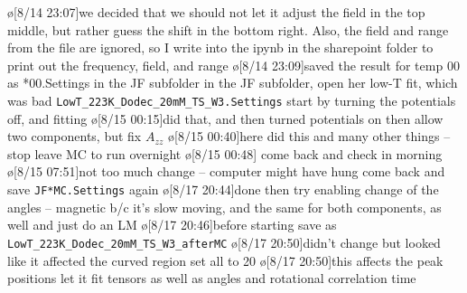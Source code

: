 \o[8/14 23:07]{we decided that we should not let it adjust the field in the top middle, but rather guess the shift in the bottom right.  Also, the field and range from the file are ignored, so I write into the ipynb in the sharepoint folder to print out the frequency, field, and range}
\o[8/14 23:09]{saved the result for temp 00 as *00.Settings in the JF subfolder}
in the JF subfolder, open her low-T fit, which was bad
\texttt{LowT_223K_Dodec_20mM_TS_W3.Settings}
start by turning the potentials off, and fitting
\o[8/15 00:15]{did that, and then turned potentials on}
then allow two components, but fix $A_{zz}$
\o[8/15 00:40]{here did this and many other things -- stop}
leave MC to run overnight
\o[8/15 00:48]{}
come back and check in morning
\o[8/15 07:51]{not too much change -- computer might have hung}
come back and save \texttt{JF*MC.Settings} again
\o[8/17 20:44]{done}
then try enabling change of the angles -- magnetic b/c it's slow moving, and the same for both components, as well and just do an LM
\o[8/17 20:46]{before starting save as \texttt{LowT_223K_Dodec_20mM_TS_W3_afterMC}}
\o[8/17 20:50]{didn't change but looked like it affected the curved region}
set all to 20
\o[8/17 20:50]{this affects the peak positions}
let it fit tensors as well as angles and rotational correlation time
